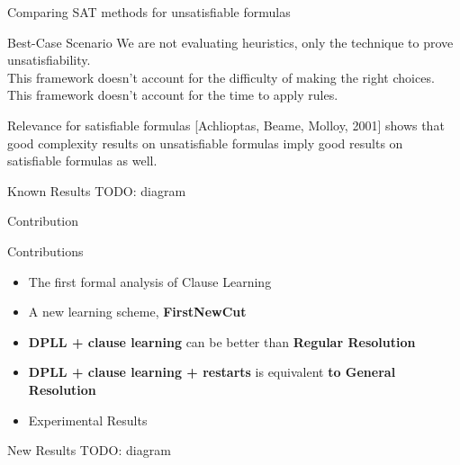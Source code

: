 \documentclass[page number]{beamer}
\begin{document}
\begin{frame}{Comparing SAT methods for unsatisfiable formulas}
  \begin{exampleblock}{Best-Case Scenario}
    We are not evaluating heuristics, only the technique to prove unsatisfiability.\\
    This framework doesn't account for the difficulty of making the right choices.\\
    This framework doesn't account for the time to apply rules.
  \end{exampleblock}
  \vfill
  \begin{block}{Relevance for satisfiable formulas}
    [Achlioptas, Beame, Molloy, 2001] shows that good complexity results on unsatisfiable formulas imply good results on satisfiable formulas as well.
  \end{block}
    
\end{frame}

\begin{frame}{Known Results}
  TODO: diagram
\end{frame}
  
\begin{frame}{Contribution}
  \begin{exampleblock}{Contributions}
    \begin{itemize}
    \item The first formal analysis of Clause Learning
    \item A new learning scheme, \textbf{FirstNewCut}
    \item \textbf{DPLL + clause learning} can be better than \textbf{Regular Resolution}
    \item \textbf{DPLL + clause learning + restarts} is equivalent \textbf{to General Resolution}
    \item Experimental Results
    \end{itemize}
  \end{exampleblock}
\end{frame}

\begin{frame}{New Results}
  TODO: diagram
\end{frame}
\end{document}
